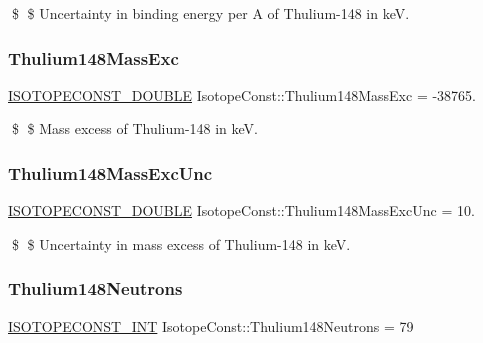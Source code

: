 \$ \$ Uncertainty in binding energy per A of Thulium-\/148 in keV. \mbox{\label{group___isotope_const-_thulium-_tm148_gaed4a6519009057a3007c3d466ca1682e}} 
\subsubsection{\texorpdfstring{Thulium148\+Mass\+Exc}{Thulium148MassExc}}
{\footnotesize\ttfamily \mbox{\hyperlink{group___isotope_const-_macros_ga8f45a7272ce02c0b4c65c44636ed719a}{I\+S\+O\+T\+O\+P\+E\+C\+O\+N\+S\+T\+\_\+\+D\+O\+U\+B\+LE}} Isotope\+Const\+::\+Thulium148\+Mass\+Exc = -\/38765.}

\$ \$ Mass excess of Thulium-\/148 in keV. \mbox{\label{group___isotope_const-_thulium-_tm148_gad8392b7290ec642f728275690cdaf690}} 
\subsubsection{\texorpdfstring{Thulium148\+Mass\+Exc\+Unc}{Thulium148MassExcUnc}}
{\footnotesize\ttfamily \mbox{\hyperlink{group___isotope_const-_macros_ga8f45a7272ce02c0b4c65c44636ed719a}{I\+S\+O\+T\+O\+P\+E\+C\+O\+N\+S\+T\+\_\+\+D\+O\+U\+B\+LE}} Isotope\+Const\+::\+Thulium148\+Mass\+Exc\+Unc = 10.}

\$ \$ Uncertainty in mass excess of Thulium-\/148 in keV. \mbox{\label{group___isotope_const-_thulium-_tm148_gaec9faf77f74639cc66447012ba2c1719}} 
\subsubsection{\texorpdfstring{Thulium148\+Neutrons}{Thulium148Neutrons}}
{\footnotesize\ttfamily \mbox{\hyperlink{group___isotope_const-_macros_ga5f18360b3e99483a35c32d789e62621c}{I\+S\+O\+T\+O\+P\+E\+C\+O\+N\+S\+T\+\_\+\+I\+NT}} Isotope\+Const\+::\+Thulium148\+Neutrons = 79}

